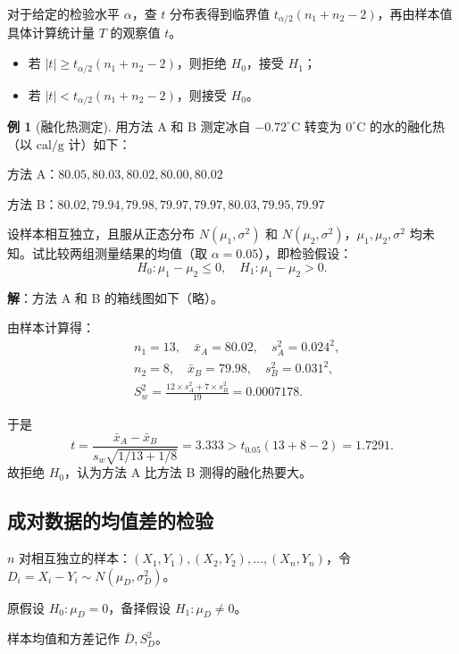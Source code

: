 \documentclass[11pt,a4paper]{report}
\theoremstyle{definition}
\newtheorem{example}{例}[chapter]
\begin{document}
对于给定的检验水平 $\alpha$，查 $t$ 分布表得到临界值 $t_{\alpha/2}(n_{1}+n_{2}-2)$，再由样本值具体计算统计量 $T$ 的观察值 $t$。

\begin{itemize}[leftmargin=2em]
    \item 若 $|t|\geq t_{\alpha/2}(n_{1}+n_{2}-2)$，则拒绝 $H_{0}$，接受 $H_{1}$；
    \item 若 $|t|<t_{\alpha/2}(n_{1}+n_{2}-2)$，则接受 $H_{0}$。
\end{itemize}

\begin{example}[融化热测定]
用方法 A 和 B 测定冰自 $-0.72^{\circ}\mathrm{C}$ 转变为 $0^{\circ}\mathrm{C}$ 的水的融化热（以 $\mathrm{cal/g}$ 计）如下：

方法 A：$80.05, 80.03, 80.02, 80.00, 80.02$

方法 B：$80.02, 79.94, 79.98, 79.97, 79.97, 80.03, 79.95, 79.97$

设样本相互独立，且服从正态分布 $N(\mu_{1},\sigma^{2})$ 和 $N(\mu_{2},\sigma^{2})$，$\mu_{1},\mu_{2},\sigma^{2}$ 均未知。试比较两组测量结果的均值（取 $\alpha=0.05$），即检验假设：
\[
H_{0}\colon\mu_{1}-\mu_{2}\leq 0,\quad H_{1}\colon\mu_{1}-\mu_{2}>0.
\]

\textbf{解}：方法 A 和 B 的箱线图如下（略）。

由样本计算得：
\[
\begin{aligned}
&n_{1}=13,\quad \bar{x}_{A}=80.02,\quad s_{A}^{2}=0.024^{2},\\
&n_{2}=8,\quad \bar{x}_{B}=79.98,\quad s_{B}^{2}=0.031^{2},\\
&S_{w}^{2}=\frac{12\times s_{A}^{2}+7\times s_{B}^{2}}{19}=0.0007178.
\end{aligned}
\]

于是
\[
t=\frac{\bar{x}_{A}-\bar{x}_{B}}{s_{w}\sqrt{1/13+1/8}}=3.333>t_{0.05}(13+8-2)=1.7291.
\]
故拒绝 $H_{0}$，认为方法 A 比方法 B 测得的融化热要大。
\end{example}

\subsection{成对数据的均值差的检验}

$n$ 对相互独立的样本：$(X_{1},Y_{1}),(X_{2},Y_{2}),\ldots,(X_{n},Y_{n})$，令 $D_{i}=X_{i}-Y_{i}\sim N(\mu_{D},\sigma_{D}^{2})$。

原假设 $H_{0}\colon\mu_{D}=0$，备择假设 $H_{1}\colon\mu_{D}\neq 0$。

样本均值和方差记作 $\bar{D},S_{D}^{2}$。
\end{document}
